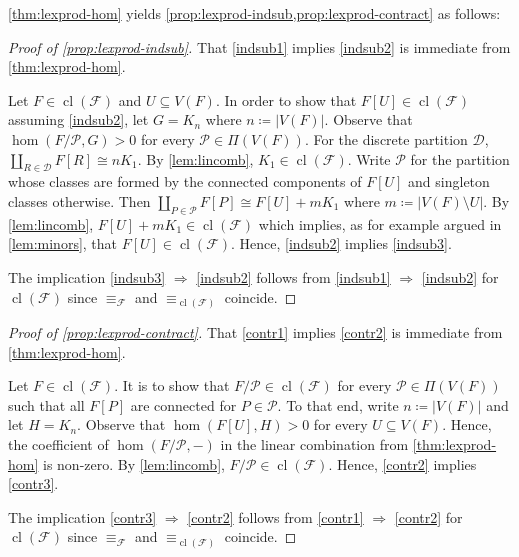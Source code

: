 \documentclass[3p,final]{elsarticle}
\DeclareMathOperator{\cl}{cl}
\begin{document}
	\cref{thm:lexprod-hom} yields \cref{prop:lexprod-indsub,prop:lexprod-contract} as follows: %
	
	\begin{proof}[Proof of \cref{prop:lexprod-indsub}]
		That \ref{indsub1} implies \ref{indsub2} is immediate from \cref{thm:lexprod-hom}.
		
		Let $F \in \cl(\mathcal{F})$ and $U \subseteq V(F)$. In order to show that $F[U] \in \cl(\mathcal{F})$ assuming \ref{indsub2}, let $G = K_n$ where $n \coloneqq |V(F)|$.
		Observe that $\hom(F/\mathcal{P}, G) > 0$ for every $\mathcal{P} \in \Pi(V(F))$. For the discrete partition $\mathcal{D}$, $\coprod_{R \in \mathcal{D}} F[R] \cong nK_1$. By \cref{lem:lincomb}, $K_1 \in \cl(\mathcal{F})$. 
		Write $\mathcal{P}$ for the partition whose classes are formed by the connected components of $F[U]$ and singleton classes otherwise. Then $\coprod_{P \in \mathcal{P}} F[P] \cong F[U] + m K_1$ where $m \coloneqq |V(F) \setminus U|$. By \cref{lem:lincomb}, $F[U] + mK_1 \in \cl(\mathcal{F})$ which implies, as for example argued in \cref{lem:minors}, that $F[U] \in \cl(\mathcal{F})$.
		Hence, \ref{indsub2} implies \ref{indsub3}.
		
		The implication \ref{indsub3} $\Rightarrow$ \ref{indsub2} follows from \ref{indsub1} $\Rightarrow$ \ref{indsub2} for $\cl(\mathcal{F})$ since $\equiv_{\mathcal{F}}$ and $\equiv_{\cl(\mathcal{F})}$ coincide.
	\end{proof}
	
	\begin{proof}[Proof of \cref{prop:lexprod-contract}]
		That \ref{contr1} implies \ref{contr2} is immediate from \cref{thm:lexprod-hom}.
		
		Let $F \in \cl(\mathcal{F})$. It is to show that $F/\mathcal{P} \in \cl(\mathcal{F})$ for every $\mathcal{P} \in \Pi(V(F))$ such that all $F[P]$ are connected for $P \in \mathcal{P}$.
		To that end, write $n \coloneqq |V(F)|$ and let $H = K_n$.
		Observe that $\hom(F[U], H) > 0$ for every $U \subseteq V(F)$.
		Hence, the coefficient of $\hom(F/\mathcal{P}, -)$ in the linear combination from \cref{thm:lexprod-hom} is non-zero. By \cref{lem:lincomb}, $F/\mathcal{P} \in \cl(\mathcal{F})$.
		Hence, \ref{contr2} implies \ref{contr3}.
		
		The implication \ref{contr3} $\Rightarrow$ \ref{contr2} follows from \ref{contr1} $\Rightarrow$ \ref{contr2} for $\cl(\mathcal{F})$ since $\equiv_{\mathcal{F}}$ and $\equiv_{\cl(\mathcal{F})}$ coincide.
	\end{proof}
	
\end{document}

